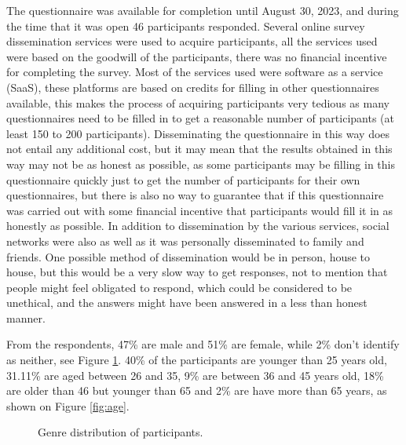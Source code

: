 The questionnaire was available for completion until August 30, 2023,
and during the time that it was open 46 participants responded.
Several online survey dissemination services were used to acquire participants,
all the services used were based on the goodwill of the participants, there
was no financial incentive for completing the survey. Most of the services
used were software as a service (SaaS), these platforms are based
on credits for filling in other questionnaires available, this makes the process
of acquiring participants very tedious as many questionnaires need to be
filled in to get a reasonable number of participants (at least 150 to
200 participants). Disseminating the questionnaire in this way does not
entail any additional cost, but it may mean that the results obtained
in this way may not be as honest as possible, as some participants may
be filling in this questionnaire quickly just to get the number of participants
for their own questionnaires, but there is also no way to guarantee that
if this questionnaire was carried out with some financial incentive that
participants would fill it in as honestly as possible. In addition to
dissemination by the various services, social networks were also as well
as it was personally disseminated to family and friends. One possible
method of dissemination would be in person, house to house,
but this would be a very slow way to get responses, not to mention that
people might feel obligated to respond, which could be considered to be
unethical, and the answers might have been answered in a less than
honest manner.

From the respondents, 47\% are male and 51\% are female, while 2\% don't identify
as neither, see Figure \ref{fig:genre}. 40\% of the participants are younger
than 25 years old, 31.11\% are aged between 26 and 35, 9\% are between
36 and 45 years old, 18\% are older than 46 but younger than 65 and 2\% are
have more than 65 years, as shown on Figure \ref{fig:age}.

\begin{figure}
    \begin{center}
        \caption{Genre distribution of participants.}
        \label{fig:genre}
    \end{center}
\end{figure}


